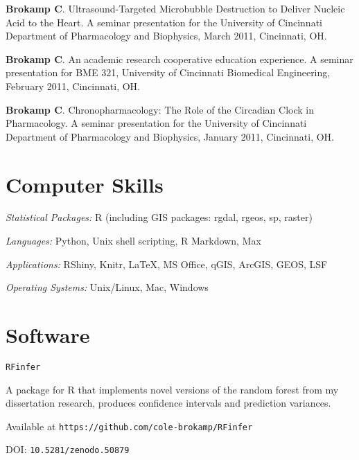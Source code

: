\documentclass[margin,line]{res}
\newenvironment{list1}{
  \begin{list}{\ding{113}}{%
      \setlength{\itemsep}{0in}
      \setlength{\parsep}{0in} \setlength{\parskip}{0in}
      \setlength{\topsep}{0in} \setlength{\partopsep}{0in} 
      \setlength{\leftmargin}{0.17in}}}{\end{list}}
\newenvironment{list3}{
  \begin{list}{}{%
      \setlength{\itemsep}{0in}
      \setlength{\parsep}{0in} \setlength{\parskip}{0in}
      \setlength{\topsep}{0in} \setlength{\partopsep}{0in} 
      \setlength{\leftmargin}{0in}}}{\end{list}}
\begin{document}
\begin{resume}
\begin{list3}
\item[] \textbf{Brokamp C}. Ultrasound-Targeted Microbubble Destruction to Deliver Nucleic Acid to the Heart.  A seminar presentation for the University of Cincinnati Department of Pharmacology and Biophysics, March 2011, Cincinnati, OH.
\item[] \textbf{Brokamp C}. An academic research cooperative education experience. A seminar presentation for BME 321, University of Cincinnati Biomedical Engineering, February 2011, Cincinnati, OH.
\item[] \textbf{Brokamp C}. Chronopharmacology: The Role of the Circadian Clock in Pharmacology.  A seminar presentation for the University of Cincinnati Department of Pharmacology and Biophysics, January 2011, Cincinnati, OH.
\end{list3}



\section{\sc Computer Skills} 

\begin{list3} \itemsep 4pt
\item[] \textit{Statistical Packages:}  R (including GIS packages: rgdal, rgeos, sp, raster)
\item[] \textit{Languages:} Python, Unix shell scripting, R Markdown, Max
\item[] \textit{Applications:} RShiny, Knitr, \LaTeX, MS Office, qGIS, ArcGIS, GEOS, LSF 
\item[] \textit{Operating Systems:}  Unix/Linux, Mac, Windows\\ 
\end{list3}

\section{\sc Software}

\texttt{RFinfer}
\begin{list1} \itemsep 2pt
\item[] A package for R that implements novel versions of the random forest from my dissertation research, produces confidence intervals and prediction variances.
\item[] Available at \texttt{https://github.com/cole-brokamp/RFinfer}
\item[] DOI: \texttt{10.5281/zenodo.50879}
\end{list1}


\end{resume}
\end{document}
